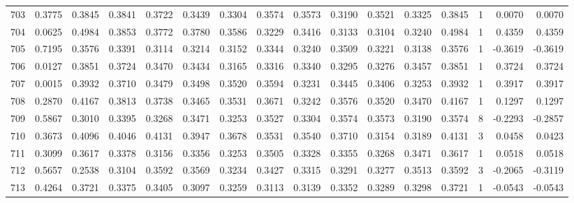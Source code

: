 \begin{tabular}{lrrrrrrrrrrrrrrr}
703 &      0.3775 &  0.3845 &  0.3841 &  0.3722 &  0.3439 &  0.3304 &  0.3574 &  0.3573 &  0.3190 &  0.3521 &   0.3325 &     0.3845 &      1 &                    0.0070 &                     0.0070 \\
704 &      0.0625 &  0.4984 &  0.3853 &  0.3772 &  0.3780 &  0.3586 &  0.3229 &  0.3416 &  0.3133 &  0.3104 &   0.3240 &     0.4984 &      1 &                    0.4359 &                     0.4359 \\
705 &      0.7195 &  0.3576 &  0.3391 &  0.3114 &  0.3214 &  0.3152 &  0.3344 &  0.3240 &  0.3509 &  0.3221 &   0.3138 &     0.3576 &      1 &                   -0.3619 &                    -0.3619 \\
706 &      0.0127 &  0.3851 &  0.3724 &  0.3470 &  0.3434 &  0.3165 &  0.3316 &  0.3340 &  0.3295 &  0.3276 &   0.3457 &     0.3851 &      1 &                    0.3724 &                     0.3724 \\
707 &      0.0015 &  0.3932 &  0.3710 &  0.3479 &  0.3498 &  0.3520 &  0.3594 &  0.3231 &  0.3445 &  0.3406 &   0.3253 &     0.3932 &      1 &                    0.3917 &                     0.3917 \\
708 &      0.2870 &  0.4167 &  0.3813 &  0.3738 &  0.3465 &  0.3531 &  0.3671 &  0.3242 &  0.3576 &  0.3520 &   0.3470 &     0.4167 &      1 &                    0.1297 &                     0.1297 \\
709 &      0.5867 &  0.3010 &  0.3395 &  0.3268 &  0.3471 &  0.3253 &  0.3527 &  0.3304 &  0.3574 &  0.3573 &   0.3190 &     0.3574 &      8 &                   -0.2293 &                    -0.2857 \\
710 &      0.3673 &  0.4096 &  0.4046 &  0.4131 &  0.3947 &  0.3678 &  0.3531 &  0.3540 &  0.3710 &  0.3154 &   0.3189 &     0.4131 &      3 &                    0.0458 &                     0.0423 \\
711 &      0.3099 &  0.3617 &  0.3378 &  0.3156 &  0.3356 &  0.3253 &  0.3505 &  0.3328 &  0.3355 &  0.3268 &   0.3471 &     0.3617 &      1 &                    0.0518 &                     0.0518 \\
712 &      0.5657 &  0.2538 &  0.3104 &  0.3592 &  0.3569 &  0.3234 &  0.3427 &  0.3315 &  0.3291 &  0.3277 &   0.3513 &     0.3592 &      3 &                   -0.2065 &                    -0.3119 \\
713 &      0.4264 &  0.3721 &  0.3375 &  0.3405 &  0.3097 &  0.3259 &  0.3113 &  0.3139 &  0.3352 &  0.3289 &   0.3298 &     0.3721 &      1 &                   -0.0543 &                    -0.0543 \\

\end{tabular}
